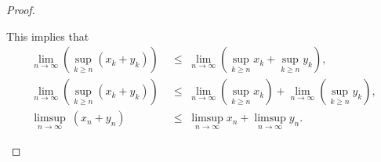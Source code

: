 \documentclass[11pt,openany]{article}
\begin{document}
\begin{proof}
\begin{enumerate}[(1)]
\[	\] This implies that \begin{align*}
		\lim\limits_{n \to \infty}\left(\sup\limits_{k\geq n}(x_k+y_k)\right) \;&\leq\; \lim\limits_{n \to \infty}\left(\sup\limits_{k\geq n}x_k+\sup\limits_{k\geq n}y_k\right),\\
		\lim\limits_{n \to \infty}\left(\sup\limits_{k\geq n}(x_k+y_k)\right) \;&\leq\; \lim\limits_{n \to \infty}\left(\sup\limits_{k\geq n}x_k\right)+\lim\limits_{n \to \infty}\left(\sup\limits_{k\geq n}y_k\right),\\
		\limsup\limits_{n \to \infty}\ (x_n+y_n) \;&\leq\; \limsup\limits_{n \to \infty} x_n + \limsup\limits_{n \to \infty} y_n.
	\end{align*}
\end{enumerate}
\end{proof}
%	
%		
%		
%		
%		
%		
%		
%	
\end{document}
